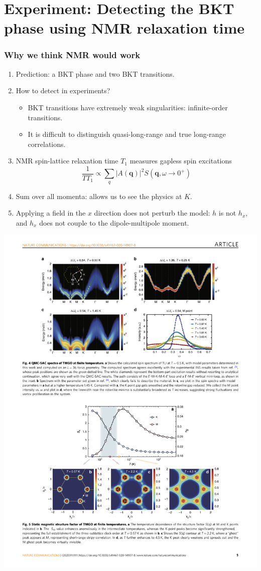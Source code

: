 \documentclass[xcolor=table, aspectratio=1610,ignorenonframetext]{beamer}
\begin{document}
\section{Experiment: Detecting the BKT phase using NMR relaxation time}

\begin{frame}
  \frametitle{Why we think NMR would work}
  \begin{enumerate}
    \item Prediction: a BKT phase and two BKT transitions.
    \item How to detect in experiments?
    \begin{itemize}
      \item BKT transitions have extremely weak singularities: infinite-order transitions.
      \item It is difficult to distinguish quasi-long-range and true long-range correlations.
    \end{itemize}
    \item NMR spin-lattice relaxation time $T_1$ measures gapless spin excitations
    \[\frac1{TT_1}\propto \sum_q|A(\bm q)|^2S(\bm q, \omega\rightarrow0^+)\]
    \item Sum over all momenta: allows us to see the physics at $K$.
    \item Applying a field in the $x$ direction does not perturb the model:
    $h$ is not $h_x$, and $h_x$ does not couple to the dipole-multipole moment.
  \end{enumerate}
  \begin{center}
    \includegraphics[width=.6\textwidth]{spinwave-fit1}
  \end{center}
\end{frame}
\end{document}
